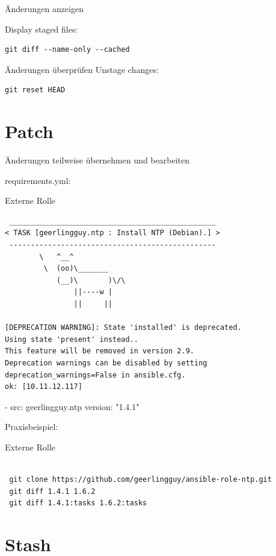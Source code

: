\begin{frame}[fragile]{Änderungen anzeigen}

Display staged files:

\begin{lstlisting}
git diff --name-only --cached
\end{lstlisting}
\end{frame}

\begin{frame}[fragile]{Änderungen überprüfen}
Unstage changes:

\begin{lstlisting}
git reset HEAD
\end{lstlisting}
\end{frame}

\section{Patch}
Änderungen teilweise übernehmen und bearbeiten

requirements.yml:

\begin{frame}[fragile]{Externe Rolle}
\begin{lstlisting}
 ________________________________________________
< TASK [geerlingguy.ntp : Install NTP (Debian).] >
 ------------------------------------------------
        \   ^__^
         \  (oo)\_______
            (__)\       )\/\
                ||----w |
                ||     ||

[DEPRECATION WARNING]: State 'installed' is deprecated.
Using state 'present' instead.. 
This feature will be removed in version 2.9. 
Deprecation warnings can be disabled by setting
deprecation_warnings=False in ansible.cfg.
ok: [10.11.12.117]
\end{lstlisting}
\end{frame}

- src: geerlingguy.ntp
  version: "1.4.1"

Praxisbeispiel:

\begin{frame}[fragile]{Externe Rolle}
\begin{lstlisting}

 git clone https://github.com/geerlingguy/ansible-role-ntp.git
 git diff 1.4.1 1.6.2
 git diff 1.4.1:tasks 1.6.2:tasks

\end{lstlisting}
\end{frame}

\section{Stash}

